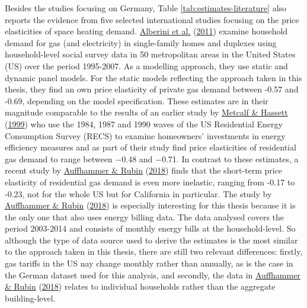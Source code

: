 \documentclass[12pt,twoside]{reedthesis}
\begin{document}
Besides the studies focusing on Germany, Table \ref{tab:estimates-literature} also reports the evidence from five selected international studies focusing on the price elasticities of space heating demand. \protect\hyperlink{ref-alberini_etal11}{Alberini et al.} (\protect\hyperlink{ref-alberini_etal11}{2011}) examine household demand for gas (and electricity) in single-family homes and duplexes using household-level social survey data in 50 metropolitan areas in the United States (US) over the period 1995-2007. As a modelling approach, they use static and dynamic panel models. For the static models reflecting the approach taken in this thesis, they find an own price elasticity of private gas demand between -0.57 and -0.69, depending on the model specification. These estimates are in their magnitude comparable to the results of an earlier study by \protect\hyperlink{ref-metcalf_hassett99}{Metcalf \& Hassett} (\protect\hyperlink{ref-metcalf_hassett99}{1999}) who use the 1984, 1987 and 1990 waves of the US Residential Energy Consumption Survey (RECS) to examine homeowners' investments in energy efficiency measures and as part of their study find price elasticities of residential gas demand to range between −0.48 and −0.71. In contrast to these estimates, a recent study by \protect\hyperlink{ref-auffhammer_rubin18}{Auffhammer \& Rubin} (\protect\hyperlink{ref-auffhammer_rubin18}{2018}) finds that the short-term price elasticity of residential gas demand is even more inelastic, ranging from -0.17 to -0.23, not for the whole US but for California in particular. The study by \protect\hyperlink{ref-auffhammer_rubin18}{Auffhammer \& Rubin} (\protect\hyperlink{ref-auffhammer_rubin18}{2018}) is especially interesting for this thesis because it is the only one that also uses energy billing data. The data analysed covers the period 2003-2014 and consists of monthly energy bills at the household-level. So although the type of data source used to derive the estimates is the most similar to the approach taken in this thesis, there are still two relevant differences: firstly, gas tariffs in the US nay change monthly rather than annually, as is the case in the German dataset used for this analysis, and secondly, the data in \protect\hyperlink{ref-auffhammer_rubin18}{Auffhammer \& Rubin} (\protect\hyperlink{ref-auffhammer_rubin18}{2018}) relates to individual households rather than the aggregate building-level.
\end{document}
